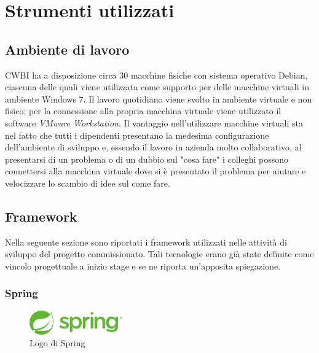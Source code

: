 \chapter{Strumenti utilizzati}
\label{cap:strumenti-utilizzati}


\setlength{\parskip}{3ex}

\section{Ambiente di lavoro}
CWBI ha a disposizione circa 30 macchine fisiche con sistema operativo Debian, ciascuna delle quali viene utilizzata come supporto per delle macchine virtuali in ambiente Windows 7. Il lavoro quotidiano viene svolto in ambiente virtuale e non fisico; per la connessione alla propria macchina virtuale viene utilizzato il software \textit{VMware Workstation}. Il vantaggio nell'utilizzare macchine virtuali sta nel fatto che tutti i dipendenti presentano la medesima configurazione dell'ambiente di sviluppo e, essendo il lavoro in azienda molto collaborativo, al presentarsi di un problema o di un dubbio sul "cosa fare" i colleghi possono connettersi alla macchina virtuale dove si è presentato il problema per aiutare e velocizzare lo scambio di idee sul come fare.

\section{Framework}
Nella seguente sezione sono riportati i framework utilizzati nelle attività di sviluppo del progetto commissionato. Tali tecnologie erano già state definite come vincolo progettuale a inizio stage e se ne riporta un'apposita spiegazione.

\pagebreak

\subsection{Spring}

\begin{figure}[!h]
	\centering
	\includegraphics[width=4cm]{../images/Spring-logo.png}
	\caption{Logo di Spring}
\end{figure}


